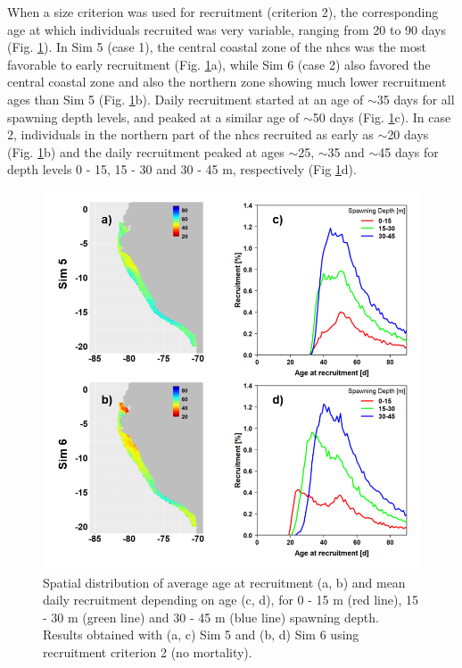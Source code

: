 When a size criterion was used for recruitment (criterion 2), the corresponding age at which individuals recruited was very variable, ranging from 20 to 90 days (Fig. \ref{Fig3_08}). In Sim 5 (case 1), the central coastal zone of the \acrshort{nhcs} was the most favorable to early recruitment (Fig. \ref{Fig3_08}a), while Sim 6 (case 2) also favored the central coastal zone and also the northern zone showing much lower recruitment ages than Sim 5 (Fig. \ref{Fig3_08}b). Daily recruitment started at an age of $\sim$35 days for all spawning depth levels, and peaked at a similar age of $\sim$50 days (Fig. \ref{Fig3_08}c). In case 2, individuals in the northern part of the \acrshort{nhcs} recruited as early as $\sim$20 days (Fig. \ref{Fig3_08}b) and the daily recruitment peaked at ages $\sim$25, $\sim$35 and $\sim$45 days for depth levels 0 - 15, 15 - 30 and 30 - 45 m, respectively (Fig \ref{Fig3_08}d).\\

\begin{figure}[ht]
	\includegraphics[width=1.0\textwidth]{figures/Fig3_08.png}
	\centering
	\caption{Spatial distribution of average age at recruitment (a, b) and mean daily recruitment depending on age (c, d), for 0 - 15 m (red line), 15 - 30 m (green line) and 30 - 45 m (blue line) spawning depth. Results obtained with (a, c) Sim 5 and (b, d) Sim 6 using recruitment criterion 2 (no mortality).}
	\label{Fig3_08}
\end{figure}


